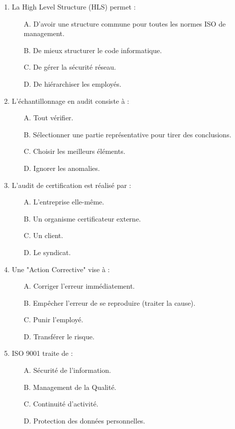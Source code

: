 \begin{enumerate}
    \item La High Level Structure (HLS) permet :
    \begin{itemize}
        \item[A.] D'avoir une structure commune pour toutes les normes ISO de management.
        \item[B.] De mieux structurer le code informatique.
        \item[C.] De gérer la sécurité réseau.
        \item[D.] De hiérarchiser les employés.
    \end{itemize}

    \item L'échantillonnage en audit consiste à :
    \begin{itemize}
        \item[A.] Tout vérifier.
        \item[B.] Sélectionner une partie représentative pour tirer des conclusions.
        \item[C.] Choisir les meilleurs éléments.
        \item[D.] Ignorer les anomalies.
    \end{itemize}

    \item L'audit de certification est réalisé par :
    \begin{itemize}
        \item[A.] L'entreprise elle-même.
        \item[B.] Un organisme certificateur externe.
        \item[C.] Un client.
        \item[D.] Le syndicat.
    \end{itemize}

    \item Une "Action Corrective" vise à :
    \begin{itemize}
        \item[A.] Corriger l'erreur immédiatement.
        \item[B.] Empêcher l'erreur de se reproduire (traiter la cause).
        \item[C.] Punir l'employé.
        \item[D.] Transférer le risque.
    \end{itemize}

    \item ISO 9001 traite de :
    \begin{itemize}
        \item[A.] Sécurité de l'information.
        \item[B.] Management de la Qualité.
        \item[C.] Continuité d'activité.
        \item[D.] Protection des données personnelles.
    \end{itemize}


\end{enumerate}
